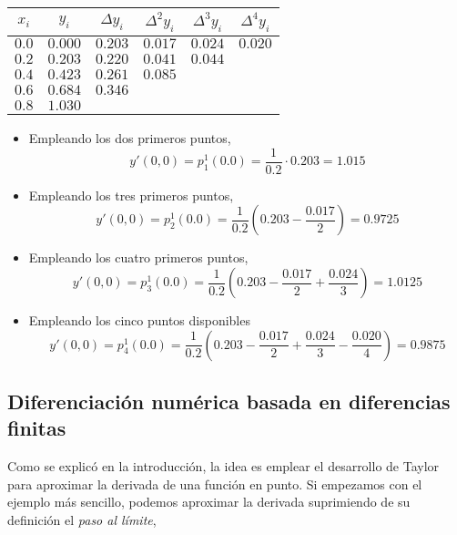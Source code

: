 \begin{table}[h]
\centering
\begin{tabular}{cccccc}
$x_i$&$y_i$&$\Delta y_i$&$\Delta^2 y_i$&$\Delta^3 y_i$ & $\Delta^4 y_i$\\
\hline
$0.0$& $0.000$& $0.203$ &$0.017$ &$0.024$ &$0.020$\\
$0.2$ &$0.203$ &$0.220$ &$0.041$ &$0.044$\\
$0.4$ &$0.423$ &$0.261$ &$0.085$\\
$0.6$ &$0.684$ &$0.346$\\
$0.8$ &$1.030$\\
\end{tabular}
\end{table} 

\begin{itemize}
\item Empleando los dos primeros puntos,
\begin{equation*}
y'(0,0)=p_1^1(0.0)=\frac{1}{0.2}\cdot 0.203= 1.015
\end{equation*}
\item Empleando los tres primeros puntos,
\begin{equation*}
y'(0,0)=p_2^1(0.0)=\frac{1}{0.2}\left( 0.203-\frac{0.017}{2}\right)= 0.9725
\end{equation*}
\item Empleando los cuatro primeros puntos,
\begin{equation*}
y'(0,0)=p_3^1(0.0)=\frac{1}{0.2}\left( 0.203-\frac{0.017}{2}+\frac{0.024}{3}\right)= 1.0125
\end{equation*}
\item Empleando los cinco puntos disponibles
\begin{equation*}
y'(0,0)=p_4^1(0.0)=\frac{1}{0.2}\left( 0.203-\frac{0.017}{2}+\frac{0.024}{3}-\frac{0.020}{4}\right)= 0.9875
\end{equation*}
\end{itemize}

\subsection{Diferenciación numérica basada en diferencias finitas}
Como se explicó en la introducción, la idea es emplear el desarrollo de Taylor para aproximar la derivada de una función en punto. Si empezamos con el ejemplo más sencillo, podemos aproximar la derivada suprimiendo de su definición el \emph{paso al límite},

